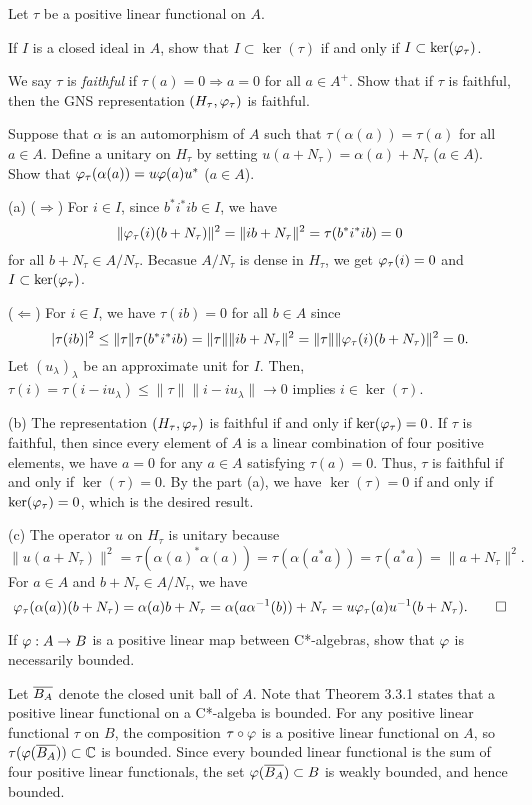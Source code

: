 \documentclass{../solution}
\begin{document}
\begin{prb}
Let $\tau$ be a positive linear functional on $A$.
\begin{parts}
\item
If $I$ is a closed ideal in $A$, show that $I\subset\ker(\tau)$ if and only if $I\subset\ker(\varphi_\tau)$.
\item
We say $\tau$ is \emph{faithful} if $\tau(a)=0\Rightarrow a=0$ for all $a\in A^+$.
Show that if $\tau$ is faithful, then the GNS representation $(H_\tau,\varphi_\tau)$ is faithful.
\item
Suppose that $\alpha$ is an automorphism of $A$ such that $\tau(\alpha(a))=\tau(a)$ for all $a\in A$.
Define a unitary on $H_\tau$ by setting $u(a+N_\tau)=\alpha(a)+N_\tau$ ($a\in A$).
Show that $\varphi_\tau(\alpha(a))=u\varphi(a)u^*$ ($a\in A$).
\end{parts}
\end{prb}
\begin{sol}
(a)
($\Rightarrow$)
For $i\in I$, since $b^*i^*ib\in I$, we have
\[\|\varphi_\tau(i)(b+N_\tau)\|^2=\|ib+N_\tau\|^2=\tau(b^*i^*ib)=0\]
for all $b+N_\tau\in A/N_\tau$.
Becasue $A/N_\tau$ is dense in $H_\tau$, we get $\varphi_\tau(i)=0$ and $I\subset\ker(\varphi_\tau)$.

($\Leftarrow$)
For $i\in I$, we have $\tau(ib)=0$ for all $b\in A$ since
\[|\tau(ib)|^2\le\|\tau\|\tau(b^*i^*ib)=\|\tau\|\|ib+N_\tau\|^2=\|\tau\|\|\varphi_\tau(i)(b+N_\tau)\|^2=0.\]
Let $(u_\lambda)_\lambda$ be an approximate unit for $I$.
Then, $\tau(i)=\tau(i-iu_\lambda)\le\|\tau\|\|i-iu_\lambda\|\to0$ implies $i\in\ker(\tau)$.

(b)
The representation $(H_\tau,\varphi_\tau)$ is faithful if and only if $\ker(\varphi_\tau)=0$.
If $\tau$ is faithful, then since every element of $A$ is a linear combination of four positive elements, we have $a=0$ for any $a\in A$ satisfying $\tau(a)=0$.
Thus, $\tau$ is faithful if and only if $\ker(\tau)=0$.
By the part (a), we have $\ker(\tau)=0$ if and only if $\ker(\varphi_\tau)=0$, which is the desired result.

(c)
The operator $u$ on $H_\tau$ is unitary because
\[\|u(a+N_\tau)\|^2=\tau(\alpha(a)^*\alpha(a))=\tau(\alpha(a^*a))=\tau(a^*a)=\|a+N_\tau\|^2.\]
For $a\in A$ and $b+N_\tau\in A/N_\tau$, we have
\[\varphi_\tau(\alpha(a))(b+N_\tau)=\alpha(a)b+N_\tau=\alpha(a\alpha^{-1}(b))+N_\tau=u\varphi_\tau(a)u^{-1}(b+N_\tau).\qedhere\]
\end{sol}


\begin{prb}
If $\varphi:A\to B$ is a positive linear map between C*-algebras, show that $\varphi$ is necessarily bounded.
\end{prb}
\begin{sol}
Let $\overline{B_A}$ denote the closed unit ball of $A$.
Note that Theorem 3.3.1 states that a positive linear functional on a C*-algeba is bounded.
For any positive linear functional $\tau$ on $B$, the composition $\tau\circ\varphi$ is a positive linear functional on $A$, so $\tau(\varphi(\overline{B_A}))\subset\mathbb{C}$ is bounded.
Since every bounded linear functional is the sum of four positive linear functionals, the set $\varphi(\overline{B_A})\subset B$ is weakly bounded, and hence bounded.
\end{sol}
\end{document}
